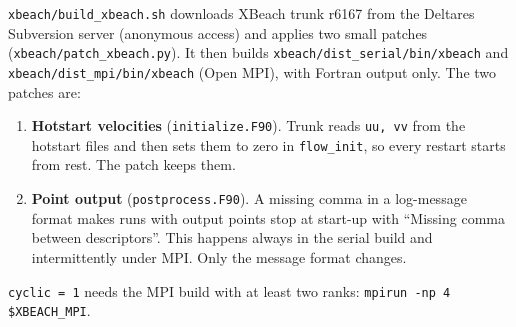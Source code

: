 \documentclass[11pt,a4paper]{article}
\newcommand{\code}[1]{\texttt{#1}}
\begin{document}
\code{xbeach/build\_xbeach.sh} downloads XBeach trunk r6167 from the Deltares Subversion server
(anonymous access) and applies two small patches (\code{xbeach/patch\_xbeach.py}). It then builds
\code{xbeach/dist\_serial/bin/xbeach} and \code{xbeach/dist\_mpi/bin/xbeach} (Open MPI), with Fortran
output only. The two patches are:
\begin{enumerate}
\item \textbf{Hotstart velocities} (\code{initialize.F90}). Trunk reads \code{uu, vv} from the hotstart
      files and then sets them to zero in \code{flow\_init}, so every restart starts from rest. The patch
      keeps them.
\item \textbf{Point output} (\code{postprocess.F90}). A missing comma in a log-message format makes runs
      with output points stop at start-up with ``Missing comma between descriptors''. This happens always
      in the serial build and intermittently under MPI. Only the message format changes.
\end{enumerate}
\code{cyclic = 1} needs the MPI build with at least two ranks: \code{mpirun -np 4 \$XBEACH\_MPI}.
\end{document}
